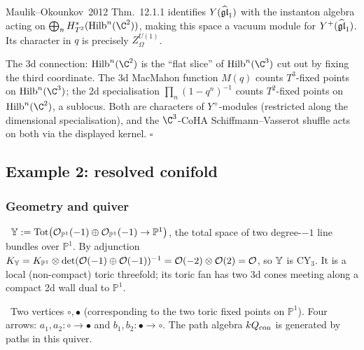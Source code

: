 Maulik--Okounkov~2012 Thm.~12.1.1 identifies $Y(\widehat{\mathfrak{gl}}_1)$ with the instanton
algebra acting on $\bigoplus_n H^*_{T^2}(\Hilb^n(\C^2))$, making this space a
vacuum module for $Y^+(\widehat{\mathfrak{gl}}_1)$. Its character in $q$ is precisely
$Z^{U(1)}_\Omega$.

The 3d connection: $\Hilb^n(\C^2)$ is the ``flat slice'' of $\Hilb^n(\C^3)$ cut
out by fixing the third coordinate. The 3d MacMahon function $M(q)$ counts
$T^3$-fixed points on $\Hilb^n(\C^3)$; the 2d specialisation
$\prod_n (1 - q^n)^{-1}$ counts $T^2$-fixed points on $\Hilb^n(\C^2)$, a
sublocus. Both are characters of $Y^+$-modules (restricted along the
dimensional specialisation), and the $\C^3$-CoHA Schiffmann--Vasserot shuffle
acts on both via the displayed kernel.
\hfill$\square$

\subsection{Example 2: resolved conifold}
\label{w17:subsec:resolved-conifold}

\subsubsection{Geometry and quiver}
\label{w17:subsubsec:conifold-geometry}

\begin{definition}
\label{w17:def:resolved-conifold}
\ClaimStatusDefinition\
$\mathbb{Y} := \mathrm{Tot}\bigl(\mathcal{O}_{\mathbb{P}^1}(-1) \oplus
\mathcal{O}_{\mathbb{P}^1}(-1) \to \mathbb{P}^1\bigr)$,
the total space of two degree-$-1$ line bundles over $\mathbb{P}^1$. By
adjunction $K_{\mathbb{Y}} = K_{\mathbb{P}^1} \otimes \det(\mathcal{O}(-1) \oplus
\mathcal{O}(-1))^{-1} = \mathcal{O}(-2) \otimes \mathcal{O}(2) = \mathcal{O}$,
so $\mathbb{Y}$ is CY$_3$. It is a local (non-compact) toric threefold; its toric fan
has two 3d cones meeting along a compact 2d wall dual to $\mathbb{P}^1$.
\end{definition}

\begin{definition}
\label{w17:def:kw-quiver}
\ClaimStatusDefinition\ Two vertices $\circ, \bullet$ (corresponding to the two
toric fixed points on $\mathbb{P}^1$). Four arrows:
$a_1, a_2: \circ \to \bullet$ and $b_1, b_2: \bullet \to \circ$. The path
algebra $kQ_{\mathrm{con}}$ is generated by paths in this quiver.
\end{definition}

